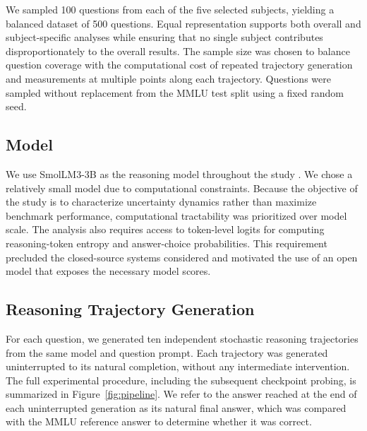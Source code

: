 \documentclass{article}
\begin{document}
We sampled 100 questions from each of the five selected subjects, yielding a balanced dataset of 500 questions. Equal representation supports both overall and subject-specific analyses while ensuring that no single subject contributes disproportionately to the overall results. The sample size was chosen to balance question coverage with the computational cost of repeated trajectory generation and measurements at multiple points along each trajectory. Questions were sampled without replacement from the MMLU test split using a fixed random seed.

\subsection{Model}

We use SmolLM3-3B as the reasoning model throughout the study \cite{bakouch2025smollm3}. We chose a relatively small model due to computational constraints. Because the objective of the study is to characterize uncertainty dynamics rather than maximize benchmark performance, computational tractability was prioritized over model scale. The analysis also requires access to token-level logits for computing reasoning-token entropy and answer-choice probabilities. This requirement precluded the closed-source systems considered and motivated the use of an open model that exposes the necessary model scores.


\subsection{Reasoning Trajectory Generation}
\label{sec:trajectory-generation}

For each question, we generated ten independent stochastic reasoning trajectories from the same model and question prompt. Each trajectory was generated uninterrupted to its natural completion, without any intermediate intervention. The full experimental procedure, including the subsequent checkpoint probing, is summarized in Figure~\ref{fig:pipeline}. We refer to the answer reached at the end of each uninterrupted generation as its natural final answer, which was compared with the MMLU reference answer to determine whether it was correct.
\end{document}
